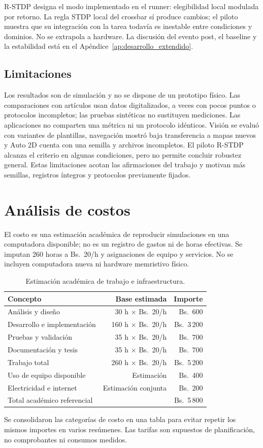 R-STDP designa el modo implementado en el runner: elegibilidad local
modulada por retorno. La regla STDP local del crossbar s\'i produce cambios;
el piloto muestra que su integraci\'on con la tarea todav\'ia es inestable entre
condiciones y dominios. No se extrapola a hardware. La discusi\'on del evento
post, el baseline y la estabilidad est\'a en el Ap\'endice~\ref{ap:desarrollo_extendido}.

\subsection{Limitaciones}
\label{sec:limitaciones}

Los resultados son de simulaci\'on y no se dispone de un prototipo f\'isico.
Las comparaciones con art\'iculos usan datos digitalizados, a veces con pocos
puntos o protocolos incompletos; las pruebas sint\'eticas no sustituyen
mediciones. Las aplicaciones no comparten una m\'etrica ni un protocolo
id\'enticos. Visi\'on se evalu\'o con variantes de plantillas, navegaci\'on mostr\'o
baja transferencia a mapas nuevos y Auto 2D cuenta con una semilla y
archivos incompletos. El piloto R-STDP alcanza el criterio en algunas
condiciones, pero no permite concluir robustez general. Estas limitaciones
acotan las afirmaciones del trabajo y motivan m\'as semillas, registros
\'integros y protocolos previamente fijados.

\section{An\'alisis de costos}
\label{sec:analisis_costos}

El costo es una estimaci\'on acad\'emica de reproducir simulaciones en una
computadora disponible; no es un registro de gastos ni de horas efectivas.
Se imputan 260 horas a Bs.~20/h y asignaciones de equipo y servicios. No se
incluyen computadora nueva ni hardware memristivo f\'isico.

\begin{table}[H]
\centering
\small
\caption{Estimaci\'on acad\'emica de trabajo e infraestructura.}
\label{tab:costo_total}
\begin{tabular}{lrr}
\toprule
Concepto & Base estimada & Importe\\
\midrule
An\'alisis y dise\~no & 30 h $\times$ Bs.~20/h & Bs.~600\\
Desarrollo e implementaci\'on & 160 h $\times$ Bs.~20/h & Bs.~3\,200\\
Pruebas y validaci\'on & 35 h $\times$ Bs.~20/h & Bs.~700\\
Documentaci\'on y tesis & 35 h $\times$ Bs.~20/h & Bs.~700\\
Trabajo total & 260 h $\times$ Bs.~20/h & Bs.~5\,200\\
Uso de equipo disponible & Estimaci\'on & Bs.~400\\
Electricidad e internet & Estimaci\'on conjunta & Bs.~200\\
\midrule
Total acad\'emico referencial & & Bs.~5\,800\\
\bottomrule
\end{tabular}
\end{table}

Se consolidaron las categor\'ias de costo en una tabla para evitar repetir
los mismos importes en varios res\'umenes. Las tarifas son supuestos de
planificaci\'on, no comprobantes ni consumos medidos.
